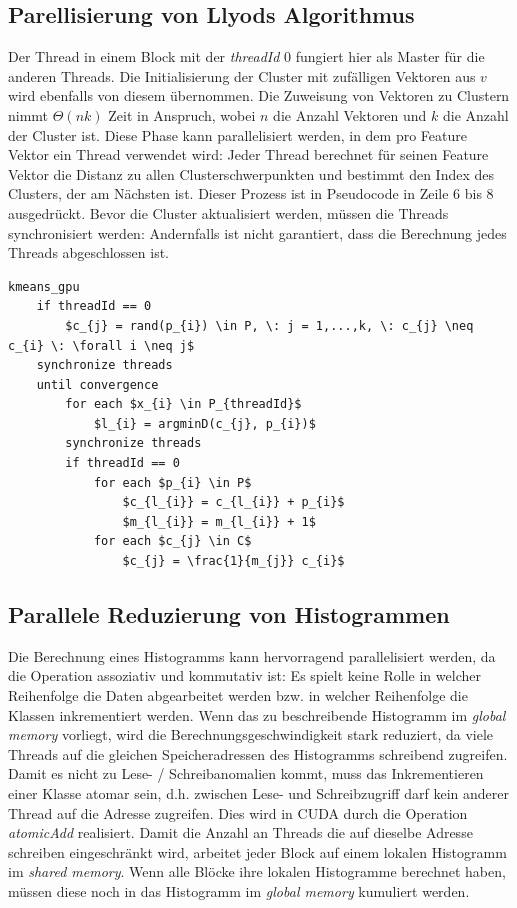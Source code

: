 \subsection{Parellisierung von Llyods Algorithmus}

Der Thread in einem Block mit der \textit{threadId} 0 fungiert hier als Master für die anderen Threads. Die Initialisierung der Cluster mit zufälligen Vektoren aus $v$ wird ebenfalls von diesem übernommen. Die Zuweisung von Vektoren zu Clustern nimmt $\Theta(nk)$ Zeit in Anspruch, wobei $n$ die Anzahl Vektoren und $k$ die Anzahl der Cluster ist. Diese Phase kann parallelisiert werden, in dem pro Feature Vektor ein Thread verwendet wird: Jeder Thread berechnet für seinen Feature Vektor die Distanz zu allen Clusterschwerpunkten und bestimmt den Index des Clusters, der am Nächsten ist. Dieser Prozess ist in Pseudocode in Zeile 6 bis 8 ausgedrückt. Bevor die Cluster aktualisiert werden, müssen die Threads synchronisiert werden: Andernfalls ist nicht garantiert, dass die Berechnung jedes Threads abgeschlossen ist.

\lstset{language=C}
\begin{lstlisting}[mathescape=true]
kmeans_gpu
	if threadId == 0
		$c_{j} = rand(p_{i}) \in P, \: j = 1,...,k, \: c_{j} \neq c_{i} \: \forall i \neq j$
	synchronize threads
	until convergence
		for each $x_{i} \in P_{threadId}$
			$l_{i} = argminD(c_{j}, p_{i})$
		synchronize threads
		if threadId == 0
			for each $p_{i} \in P$
				$c_{l_{i}} = c_{l_{i}} + p_{i}$
				$m_{l_{i}} = m_{l_{i}} + 1$
			for each $c_{j} \in C$
				$c_{j} = \frac{1}{m_{j}} c_{i}$
\end{lstlisting}

\subsection{Parallele Reduzierung von Histogrammen}

Die Berechnung eines Histogramms kann hervorragend parallelisiert werden, da die Operation assoziativ und kommutativ ist: Es spielt keine Rolle in welcher Reihenfolge die Daten abgearbeitet werden bzw. in welcher Reihenfolge die Klassen inkrementiert werden. Wenn das zu beschreibende Histogramm im \textit{global memory} vorliegt, wird die Berechnungsgeschwindigkeit stark reduziert, da viele Threads auf die gleichen Speicheradressen des Histogramms schreibend zugreifen. Damit es nicht zu Lese- / Schreibanomalien kommt, muss das Inkrementieren einer Klasse atomar sein, d.h. zwischen Lese- und Schreibzugriff darf kein anderer Thread auf die Adresse zugreifen. Dies wird in CUDA durch die Operation \textit{atomicAdd} realisiert. Damit die Anzahl an Threads die auf dieselbe Adresse schreiben eingeschränkt wird, arbeitet jeder Block auf einem lokalen Histogramm im \textit{shared memory}. Wenn alle Blöcke ihre lokalen Histogramme berechnet haben, müssen diese noch in das Histogramm im \textit{global memory} kumuliert werden.


